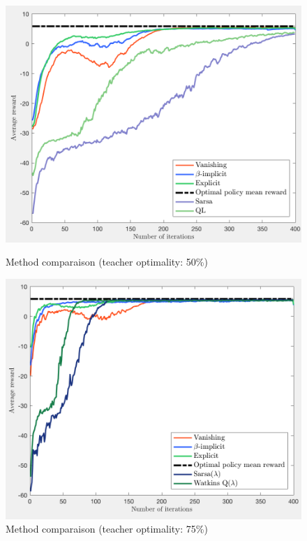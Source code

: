 \documentclass[a4paper]{report}
\begin{document}
{{{				\begin{figure}[ht!]
					\begin{minipage}{0.5\linewidth}
						\includegraphics[width=\linewidth]{loner_comp_50}
						\caption{Method comparaison (teacher optimality: 50\%)}
						\label{fig::loner_comp_50}
					\end{minipage}
					\begin{minipage}{0.5\linewidth}
						\includegraphics[width=\linewidth]{loner_comp_120}
						\caption{Method comparaison (teacher optimality: 75\%)}
						\label{fig::loner_comp_120}
					\end{minipage}
				\end{figure}
				
}}}
\end{document}
